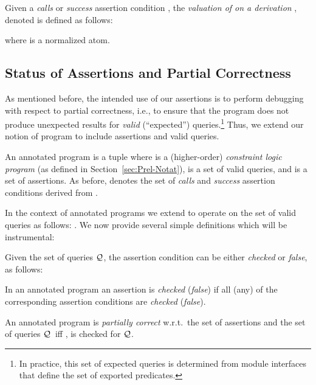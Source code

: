 \documentclass{llncs}
\newcommand{\Q}{\ensuremath{{\cal Q}}}
\begin{document}
\begin{definition}
  \label{def:assrt-valuation}
  Given a \emph{calls} or \emph{success} assertion condition , the
  \emph{valuation of  on a derivation }, denoted 
   is defined as follows: 
  
where  is a normalized atom.
\end{definition}



\subsection{Status of Assertions and Partial Correctness}
\label{sec:asrt-status}

As mentioned before, the intended use of our assertions
is to perform debugging with respect to partial correctness, i.e.,
to ensure that the program does not produce unexpected results for
\emph{valid} (``expected'') queries.\footnote{In practice, this set
  of expected queries is determined from module interfaces that 
  define the set of exported predicates.}
Thus, we extend our notion of program to include assertions and valid
queries.

\begin{definition}
  An annotated program is a tuple  where  is a
  (higher-order) \emph{constraint logic program} (as defined in
  Section~\ref{sec:Prel-Notat}),  is a set of valid queries, and
   is a set of assertions.  As before,  denotes the set of
  \emph{calls} and \emph{success} assertion conditions derived from
  .
\end{definition}

In the context of annotated programs we extend  to
operate on the set of valid queries as follows:
.
We now provide several simple definitions which will be instrumental:

\begin{definition}
  \label{def:assrts-cond-status}
  Given the set of queries \Q, the assertion condition  can be 
  either \emph{checked} or \emph{false}, as follows:
  
\end{definition}
\begin{definition}
  \label{def:assrt-status}
  In an annotated program  an assertion  is
  \emph{checked} (\emph{false}) if all (any) of the corresponding
  assertion conditions are \emph{checked} (\emph{false}).
\end{definition}
\begin{definition}
An annotated program  is \emph{partially correct} w.r.t.\
  the set of assertions  and the set of queries \Q~iff
   ,  is checked for \Q.
\end{definition}
\end{document}
